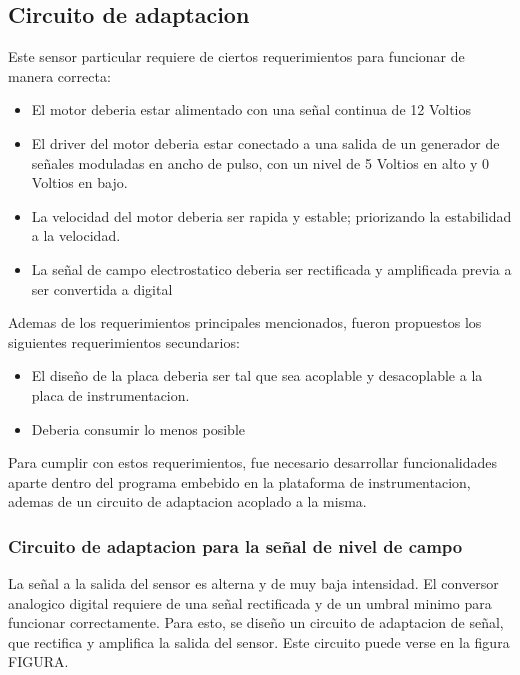 \subsection{Circuito de adaptacion} %
\label{it6:sub:circuito_de_adaptacion}


Este sensor particular requiere de ciertos requerimientos para funcionar de manera correcta:

\begin{itemize}
  \item El motor deberia estar alimentado con una señal continua de 12 Voltios
  \item El driver del motor deberia estar conectado a una salida de un generador de señales moduladas en ancho de pulso, con un nivel de 5 Voltios en alto y 0 Voltios en bajo.
  \item La velocidad del motor deberia ser rapida y estable; priorizando la estabilidad a la velocidad.
  \item La señal de campo electrostatico deberia ser rectificada y amplificada previa a ser convertida a digital
\end{itemize}


Ademas de los requerimientos principales mencionados, fueron propuestos los siguientes requerimientos secundarios:

\begin{itemize}
  \item El diseño de la placa deberia ser tal que sea acoplable y desacoplable a la placa de instrumentacion.
  \item Deberia consumir lo menos posible
\end{itemize}

Para cumplir con estos requerimientos, fue necesario desarrollar funcionalidades aparte dentro del programa embebido en la plataforma de instrumentacion, ademas de un circuito de adaptacion acoplado a la misma.

\subsubsection{Circuito de adaptacion para la señal de nivel de campo} %
\label{it6:ssub:circuito_de_adaptacion_para_la_señal_de_nivel_de_campo}

La señal a la salida del sensor es alterna y de muy baja intensidad. El conversor analogico digital requiere de una señal rectificada y de un umbral minimo para funcionar correctamente. Para esto, se diseño un circuito de adaptacion de señal, que rectifica y amplifica la salida del sensor. Este circuito puede verse en la figura FIGURA.  

